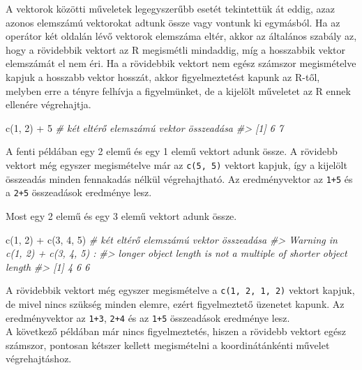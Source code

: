 \documentclass[
]{book}
\newenvironment{Shaded}{\begin{snugshade}}{\end{snugshade}}
\newcommand{\CommentTok}[1]{\textcolor[rgb]{0.56,0.35,0.01}{\textit{#1}}}
\newcommand{\DecValTok}[1]{\textcolor[rgb]{0.00,0.00,0.81}{#1}}
\newcommand{\FunctionTok}[1]{\textcolor[rgb]{0.00,0.00,0.00}{#1}}
\newcommand{\NormalTok}[1]{#1}
\newcommand{\SpecialCharTok}[1]{\textcolor[rgb]{0.00,0.00,0.00}{#1}}
\begin{document}
A vektorok közötti műveletek legegyszerűbb esetét tekintettük át eddig, azaz azonos elemszámú vektorokat adtunk össze vagy vontunk ki egymásból. Ha az operátor két oldalán lévő vektorok elemszáma eltér, akkor az általános szabály az, hogy a rövidebbik vektort az R megismétli mindaddig, míg a hosszabbik vektor elemszámát el nem éri. Ha a rövidebbik vektort nem egész számszor megismételve kapjuk a hosszabb vektor hosszát, akkor figyelmeztetést kapunk az R-től, melyben erre a tényre felhívja a figyelmünket, de a kijelölt műveletet az R ennek ellenére végrehajtja.

\begin{Shaded}
\begin{Highlighting}[]
\FunctionTok{c}\NormalTok{(}\DecValTok{1}\NormalTok{, }\DecValTok{2}\NormalTok{) }\SpecialCharTok{+} \DecValTok{5}  \CommentTok{\# két eltérő elemszámú vektor összeadása }
\CommentTok{\#\textgreater{} [1] 6 7}
\end{Highlighting}
\end{Shaded}

A fenti példában egy 2 elemű és egy 1 elemű vektort adunk össze. A rövidebb vektort még egyszer megismételve már az \texttt{c(5,\ 5)} vektort kapjuk, így a kijelölt összeadás minden fennakadás nélkül végrehajtható. Az eredményvektor az \texttt{1+5} és a \texttt{2+5} összeadások eredménye lesz.

Most egy 2 elemű és egy 3 elemű vektort adunk össze.

\begin{Shaded}
\begin{Highlighting}[]
\FunctionTok{c}\NormalTok{(}\DecValTok{1}\NormalTok{, }\DecValTok{2}\NormalTok{) }\SpecialCharTok{+} \FunctionTok{c}\NormalTok{(}\DecValTok{3}\NormalTok{, }\DecValTok{4}\NormalTok{, }\DecValTok{5}\NormalTok{)  }\CommentTok{\# két eltérő elemszámú vektor összeadása }
\CommentTok{\#\textgreater{} Warning in c(1, 2) + c(3, 4, 5) :}
\CommentTok{\#\textgreater{}   longer object length is not a multiple of shorter object length}
\CommentTok{\#\textgreater{} [1] 4 6 6}
\end{Highlighting}
\end{Shaded}

A rövidebbik vektort még egyszer megismételve a \texttt{c(1,\ 2,\ 1,\ 2)} vektort kapjuk, de mivel nincs szükség minden elemre, ezért figyelmeztető üzenetet kapunk. Az eredményvektor az \texttt{1+3}, \texttt{2+4} és az \texttt{1+5} összeadások eredménye lesz.\\
A következő példában már nincs figyelmeztetés, hiszen a rövidebb vektort egész számszor, pontosan kétszer kellett megismételni a koordinátánkénti művelet végrehajtáshoz.
\end{document}
